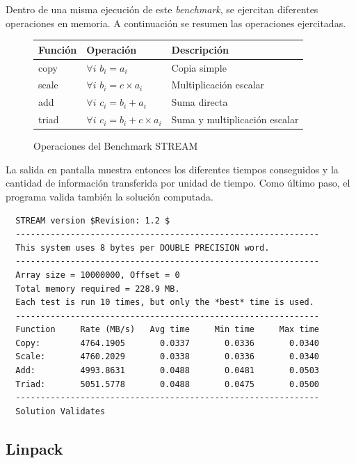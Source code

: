 \documentclass[a4paper]{report}
\begin{document}
\bigskip

Dentro de una misma ejecuci\'on de este {\it benchmark}, se ejercitan diferentes
operaciones en memoria. A continuaci\'on se resumen las operaciones ejercitadas.

\begin{figure}[H]
  \begin{center}
    \begin{tabular}{|l|l|l|}\hline
      {\bf Funci\'on} & {\bf Operaci\'on} & {\bf Descripci\'on} \\ \hline
      copy & $ \forall i $ $ b_{i} = a_{i} $ & Copia simple \\ \hline
      scale & $ \forall i $ $ b_{i} = c \times a_{i} $ & Multiplicaci\'on escalar \\ \hline
      add & $ \forall i $ $ c_{i} = b_{i} + a_{i} $ & Suma directa \\ \hline
      triad & $ \forall i $ $ c_{i} = b_{i} + c \times a_{i} $ & Suma y multiplicaci\'on escalar \\ \hline
    \end{tabular}
    \caption{Operaciones del Benchmark STREAM}
   \end{center}
 \label{stream}
\end{figure}

La salida en pantalla muestra entonces los diferentes tiempos conseguidos y la cantidad de informaci\'on transferida por unidad de tiempo.
Como \'ultimo paso, el programa valida tambi\'en la soluci\'on computada.

{\small
\begin{verbatim}
  STREAM version $Revision: 1.2 $
  -------------------------------------------------------------
  This system uses 8 bytes per DOUBLE PRECISION word.
  -------------------------------------------------------------
  Array size = 10000000, Offset = 0
  Total memory required = 228.9 MB.
  Each test is run 10 times, but only the *best* time is used.
  -------------------------------------------------------------
  Function     Rate (MB/s)   Avg time     Min time     Max time
  Copy:        4764.1905       0.0337       0.0336       0.0340
  Scale:       4760.2029       0.0338       0.0336       0.0340
  Add:         4993.8631       0.0488       0.0481       0.0503
  Triad:       5051.5778       0.0488       0.0475       0.0500
  -------------------------------------------------------------
  Solution Validates
\end{verbatim}
}

\subsection{Linpack}
\end{document}
